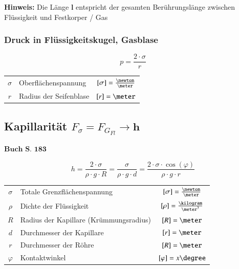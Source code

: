 \medskip

\textbf{Hinweis:} Die Länge $\bm{l}$ entspricht der gesamten Berührungslänge zwischen Flüssigkeit und Festkorper / Gas

\subsubsection{Druck in Flüssigkeitskugel, Gasblase}

\begin{minipage}[c]{0.3\columnwidth}
	$$ \boxed{ p = \frac{2 \cdot \sigma}{r} } $$ 
\end{minipage}
\hfill
\begin{minipage}[c]{0.66\columnwidth}
	\renewcommand{\arraystretch}{1.3}
	\begin{tabular}{c l c}
		$\sigma$    & Oberflächenspannung       & $[\sigma] = \frac{\newton}{\meter}$ \\
		$r$         & Radius der Seifenblase    & $[r] = \meter$
	\end{tabular}
	\renewcommand{\arraystretch}{1}
\end{minipage} \newline


\subsection[Kapillarität]{Kapillarität $F_{\sigma} = F_{G_{Fl}} \rightarrow \bm{h}$}
\begin{flushright}
	$\boxed{\textbf{Buch S. 183}}$
\end{flushright}

$$\boxed{  h = \frac{2 \cdot \sigma}{\rho \cdot g \cdot R} = \frac{\sigma}{\rho \cdot g \cdot d} = \frac{2 \cdot \sigma \cdot \cos(\varphi)}{\rho \cdot g \cdot r} }$$ 


\begin{tabular}{c l c}
	$\sigma$ & Totale Grenzflächenspannung            & $[\sigma] = \frac{\newton}{\meter}$   \\
	 $\rho$  & Dichte der Flüssigkeit                 & $[\rho] = \frac{\kilogram}{\meter^3}$ \\
	  $R$    & Radius der Kapillare (Krümmungsradius) & $[R] = \meter$                        \\
	  $d$    & Durchmesser der Kapillare              & $[r] = \meter$                        \\
	  $r$    & Durchmesser der Röhre                  & $[R] = \meter$ \\
	  $\varphi$ & Kontaktwinkel & $[\varphi] = x\degree$
\end{tabular}

